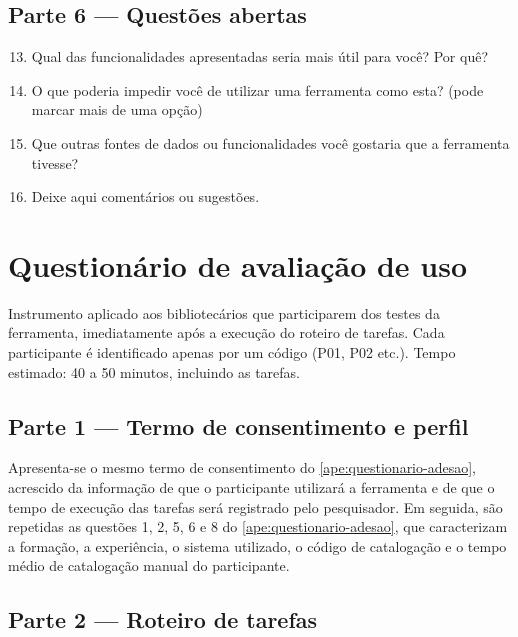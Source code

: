 \section*{Parte 6 --- Questões abertas}

\begin{enumerate}
    \setcounter{enumi}{12}
    \item Qual das funcionalidades apresentadas seria mais útil para você? Por quê?
    \item O que poderia impedir você de utilizar uma ferramenta como esta? (pode marcar mais de uma opção)\\
    \item Que outras fontes de dados ou funcionalidades você gostaria que a ferramenta tivesse?
    \item Deixe aqui comentários ou sugestões.
\end{enumerate}

\chapter{Questionário de avaliação de uso}
\label{ape:questionario-avaliacao}

Instrumento aplicado aos bibliotecários que participarem dos testes da ferramenta, imediatamente após a execução do roteiro de tarefas. Cada participante é identificado apenas por um código (P01, P02 etc.). Tempo estimado: 40 a 50 minutos, incluindo as tarefas.

\section*{Parte 1 --- Termo de consentimento e perfil}

Apresenta-se o mesmo termo de consentimento do \autoref{ape:questionario-adesao}, acrescido da informação de que o participante utilizará a ferramenta e de que o tempo de execução das tarefas será registrado pelo pesquisador. Em seguida, são repetidas as questões 1, 2, 5, 6 e 8 do \autoref{ape:questionario-adesao}, que caracterizam a formação, a experiência, o sistema utilizado, o código de catalogação e o tempo médio de catalogação manual do participante.

\section*{Parte 2 --- Roteiro de tarefas}

